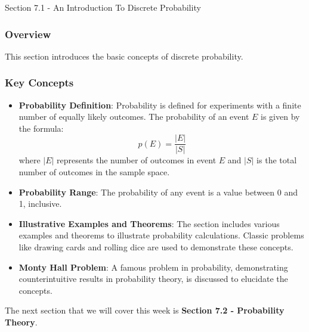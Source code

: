 \begin{notes}{Section 7.1 - An Introduction To Discrete Probability}
    \subsubsection*{Overview}

    This section introduces the basic concepts of discrete probability. \vspace*{1em}

    \subsubsection*{Key Concepts}

    \begin{itemize}
        \item \textbf{Probability Definition}: Probability is defined for experiments with a finite number of equally likely outcomes. The probability of an event $E$ is given by the formula:
            \begin{equation*}
            p(E) = \frac{|E|}{|S|}
            \end{equation*}
        where $|E|$ represents the number of outcomes in event $E$ and $|S|$ is the total number of outcomes in the sample space.
        \item \textbf{Probability Range}: The probability of any event is a value between 0 and 1, inclusive.
        \item \textbf{Illustrative Examples and Theorems}: The section includes various examples and theorems to illustrate probability calculations. Classic problems like drawing cards and rolling 
        dice are used to demonstrate these concepts.
        \item \textbf{Monty Hall Problem}: A famous problem in probability, demonstrating counterintuitive results in probability theory, is discussed to elucidate the concepts.
    \end{itemize}
\end{notes}

The next section that we will cover this week is \textbf{Section 7.2 - Probability Theory}.

